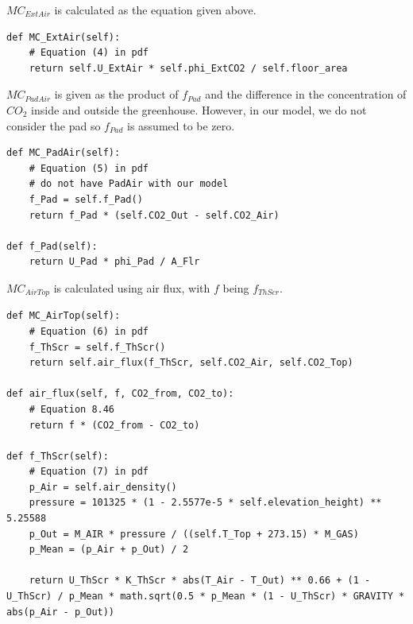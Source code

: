 \documentclass[a4paper]{article}
\numberwithin{equation}{section}
\begin{document}
\(MC_{ExtAir}\) is calculated as the equation given above.
\begin{mdframed}[leftline=false,rightline=false,backgroundcolor=magenta!10,nobreak=true]
  \begin{verbatim}
def MC_ExtAir(self):
    # Equation (4) in pdf
    return self.U_ExtAir * self.phi_ExtCO2 / self.floor_area
  \end{verbatim}
\end{mdframed}

\(MC_{PadAir}\) is given as the product of \(f_{Pad}\) and the difference in the concentration of \(CO_2\) inside and outside the greenhouse. However, in our model, we do not consider the pad so \(f_{Pad}\) is assumed to be zero.
\begin{mdframed}[leftline=false,rightline=false,backgroundcolor=magenta!10,nobreak=true]
  \begin{verbatim}
def MC_PadAir(self):
    # Equation (5) in pdf
    # do not have PadAir with our model
    f_Pad = self.f_Pad()
    return f_Pad * (self.CO2_Out - self.CO2_Air)
    
def f_Pad(self):
    return U_Pad * phi_Pad / A_Flr
  \end{verbatim}
\end{mdframed}

\(MC_{AirTop}\) is calculated using air flux, with \(f\) being \(f_{ThScr}\).
\begin{mdframed}[leftline=false,rightline=false,backgroundcolor=magenta!10,nobreak=true]
  \begin{verbatim}
def MC_AirTop(self):
    # Equation (6) in pdf
    f_ThScr = self.f_ThScr()
    return self.air_flux(f_ThScr, self.CO2_Air, self.CO2_Top)
    
def air_flux(self, f, CO2_from, CO2_to):
    # Equation 8.46
    return f * (CO2_from - CO2_to)
    
def f_ThScr(self):
    # Equation (7) in pdf
    p_Air = self.air_density()
    pressure = 101325 * (1 - 2.5577e-5 * self.elevation_height) ** 5.25588
    p_Out = M_AIR * pressure / ((self.T_Top + 273.15) * M_GAS)
    p_Mean = (p_Air + p_Out) / 2

    return U_ThScr * K_ThScr * abs(T_Air - T_Out) ** 0.66 + (1 - U_ThScr) / p_Mean * math.sqrt(0.5 * p_Mean * (1 - U_ThScr) * GRAVITY * abs(p_Air - p_Out))
  \end{verbatim}
\end{mdframed}
\end{document}

